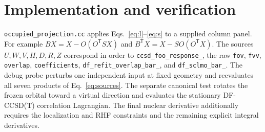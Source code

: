 \documentclass[11pt]{article}
\newcommand{\T}{^{\mathsf T}}
\begin{document}
\section{Implementation and verification}
\texttt{occupied\_projection.cc} applies Eqs.~\eqref{eq:l}--\eqref{eq:s}
to a supplied column panel. For example $BX=X-O(O\T SX)$ and
$B\T X=X-SO(O\T X)$. The sources $U,W,V,H,D,R,Z$ correspond in order
to \texttt{ccsd\_foo\_response\_}, the raw \texttt{fov}, \texttt{fvv},
\texttt{overlap}, \texttt{coefficients}, \texttt{df\_refit\_overlap\_bar\_},
and \texttt{df\_sclmo\_bar\_}. The debug probe perturbs one independent
input at fixed geometry and reevaluates all seven products of
Eq.~\eqref{eq:sources}. The separate canonical test rotates the frozen
orbital toward a virtual direction and evaluates the stationary DF-CCSD(T)
correlation Lagrangian. The final nuclear derivative additionally requires
the localization and RHF constraints and the remaining explicit integral
derivatives.
\end{document}

